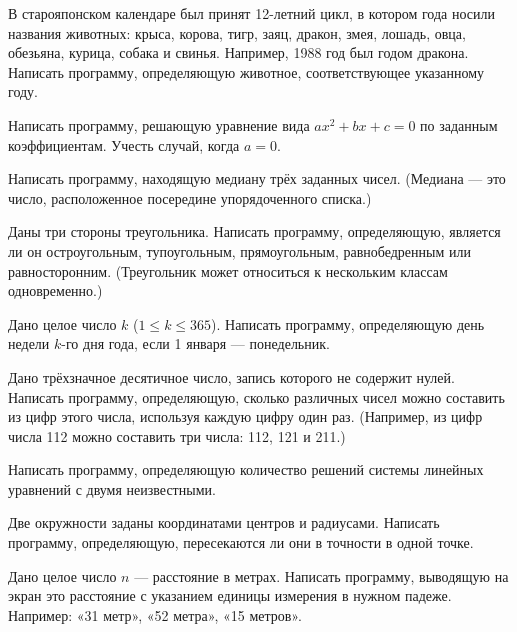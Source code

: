 \task В старояпонском календаре был принят 12-летний цикл, в котором
года носили названия животных: крыса, корова, тигр, заяц, дракон,
змея, лошадь, овца, обезьяна, курица, собака и свинья. Например, 1988
год был годом дракона. Написать программу, определяющую животное,
соответствующее указанному году.

\task Написать программу, решающую уравнение вида $a x^2 + b x + c =
0$ по заданным коэффициентам. Учесть случай, когда $a = 0.$

\task Написать программу, находящую медиану трёх заданных
чисел. (Медиана — это число, расположенное посередине упорядоченного
списка.)

\task Даны три стороны треугольника. Написать программу, определяющую,
является ли он остроугольным, тупоугольным, прямоугольным,
равнобедренным или равносторонним. (Треугольник может относиться к
нескольким классам одновременно.)

\task Дано целое число $k$ ($1 \leqslant k \leqslant 365$). Написать
программу, определяющую день недели $k$-го дня года, если 1 января —
понедельник.

\task Дано трёхзначное десятичное число, запись которого не содержит
нулей. Написать программу, определяющую, сколько различных чисел можно
составить из цифр этого числа, используя каждую цифру один раз.
(Например, из цифр числа 112 можно составить три числа: 112, 121 и 211.)

\task Написать программу, определяющую количество решений системы
линейных уравнений с двумя неизвестными.

\task Две окружности заданы координатами центров и радиусами. Написать
программу, определяющую, пересекаются ли они в точности в одной точке.

\task Дано целое число $n$ — расстояние в метрах. Написать программу,
выводящую на экран это расстояние с указанием единицы измерения в
нужном падеже. Например: «31 метр», «52 метра», «15 метров».
